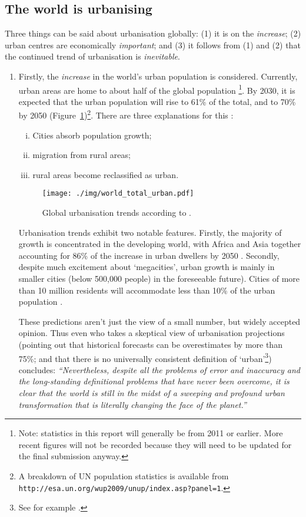 \subsection{The world is urbanising}
Three things can be said about urbanisation globally: (1) it is on the \emph{increase}; (2) urban centres are economically \emph{important}; and (3) it follows from (1) and (2) that the continued trend of urbanisation is \emph{inevitable}. 
\begin{enumerate}
	\item Firstly, the \emph{increase} in the world's urban population is considered. Currently, urban areas are home to about half of the global population \citep{AREAS2012}\footnote{Note: statistics in this report will generally be from 2011 or earlier. More recent figures will not be recorded because they will need to be updated for the final submission anyway.}. By 2030, it is expected that the urban population will rise to 61\% of the total, and to 70\% by 2050 (Figure~\ref{fig:urban_trends})\footnote{A breakdown of UN population statistics is available from \texttt{http://esa.un.org/wup2009/unup/index.asp?panel=1}.}. There are three explanations for this \citep{Cohen2006}:
	\begin{enumerate}[(i)]
		\item Cities absorb population growth; 
		\item migration from rural areas;
		\item rural areas become reclassified as urban. 
	\end{enumerate}	

\begin{figure}[h]
	\centering
	\texttt{[image: ./img/world\_total\_urban.pdf]} 
	\caption{Global urbanisation trends according to \citet{AREAS2012}.} \label{fig:urban_trends}
\end{figure}

	Urbanisation trends exhibit two notable features. Firstly, the majority of growth is concentrated in the developing world, with Africa and Asia together accounting for 86\% of the increase in urban dwellers by 2050 \citep{York2011}. Secondly, despite much excitement about `megacities', urban growth is mainly in smaller cities (below 500,000 people) in the foreseeable future). Cities of more than 10 million residents will accommodate less than 10\% of the urban population \citep{Cohen2006}.


These predictions aren't just the view of a small number, but widely accepted opinion. Thus even \citet{Cohen2004} who takes a skeptical view of urbanisation projections (pointing out that historical forecasts can be overestimates by more than 75\%; and that there is no universally consistent definition of `urban'\footnote{See for example \citet{DepartmentforCommunitiesandLocalGovernment2006}.}) concludes: \emph{``Nevertheless, despite all the problems of error and inaccuracy and the long-standing definitional problems that have never been overcome, it is clear that the world is still in the midst of a sweeping and profound urban transformation that is literally changing the face of the planet.''}


\end{enumerate}
